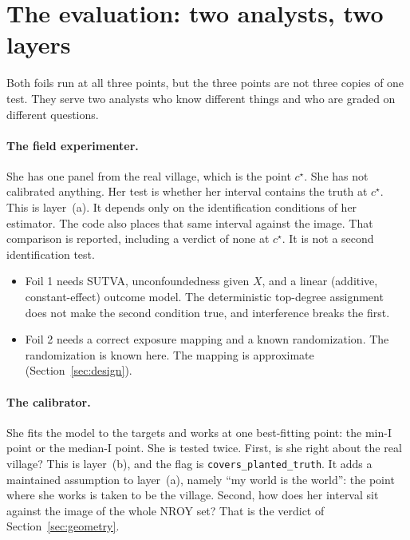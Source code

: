 \documentclass[11pt]{article}
\begin{document}
\section{The evaluation: two analysts, two layers}
\label{sec:twoanalysts}

Both foils run at all three points, but the three points are not three
copies of one test. They serve two analysts who know different things
and who are graded on different questions.

\paragraph{The field experimenter.}
She has one panel from the real village, which is the point $c^\star$.
She has not calibrated anything. Her test is whether her interval
contains the truth at $c^\star$. This is layer~(a). It depends only on the
identification conditions of her estimator. The code also places that same
interval against the image. That comparison is reported, including a
verdict of none at $c^\star$. It is not a second identification test.
\begin{itemize}
  \item Foil 1 needs SUTVA, unconfoundedness given $X$, and a linear
        (additive, constant-effect) outcome model. The deterministic
        top-degree assignment does not make the second condition true,
        and interference breaks the first.
  \item Foil 2 needs a correct exposure mapping and a known
        randomization. The randomization is known here. The mapping is
        approximate (Section~\ref{sec:design}).
\end{itemize}

\paragraph{The calibrator.}
She fits the model to the targets and works at one best-fitting point:
the min-I point or the median-I point. She is tested twice. First, is
she right about the real village? This is layer~(b), and the flag is
\texttt{covers\_planted\_truth}. It adds a maintained assumption to
layer~(a), namely ``my world is the world'': the point where she works
is taken to be the village. Second, how does her interval sit against
the image of the whole NROY set? That is the verdict of
Section~\ref{sec:geometry}.
\end{document}
